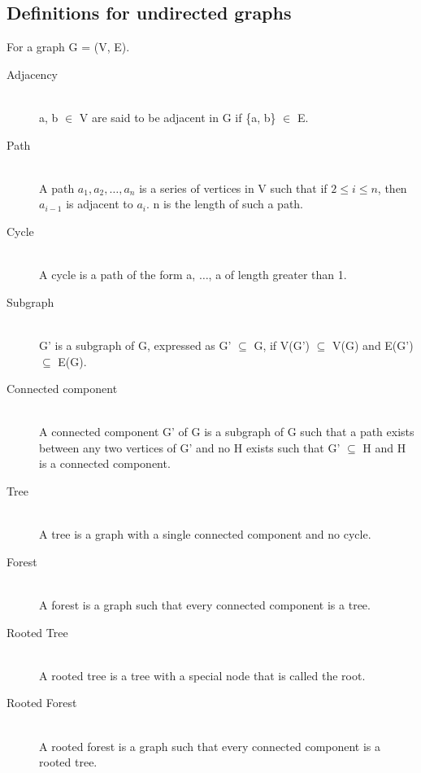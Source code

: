 \subsection{Definitions for undirected graphs}
For a graph G = (V, E).
\begin{description}
 \item[Adjacency] \hfill \\
  a, b $\in$ V are said to be adjacent in G if \{a, b\} $\in$ E.
 \item[Path] \hfill \\
  A path $a_1, a_2, \ldots, a_n$ is a series of vertices in V such that if $2 \leq i \leq n$, then $a_{i-1}$ is adjacent to $a_i$. n is the length of such a path.
 \item[Cycle] \hfill \\
  A cycle is a path of the form a, $\ldots$, a of length greater than 1.
 \item[Subgraph] \hfill \\
 G' is a subgraph of G, expressed as G' $\subseteq$ G, if V(G') $\subseteq$ V(G) and E(G') $\subseteq$ E(G).
 \item[Connected component] \hfill \\
  A connected component G' of G is a subgraph of G such that a path exists between any two vertices of G' and no H exists such that G' $\subseteq$ H and H is a connected component.
  \item[Tree] \hfill \\ 
  A tree is a graph with a single connected component and no cycle.
  \item[Forest] \hfill \\
  A forest is a graph such that every connected component is a tree.
  \item[Rooted Tree] \hfill \\ 
  A rooted tree is a tree with a special node that is called the root.
  \item[Rooted Forest] \hfill \\ 
  A rooted forest is a graph such that every connected component is a rooted tree.
\end{description}

